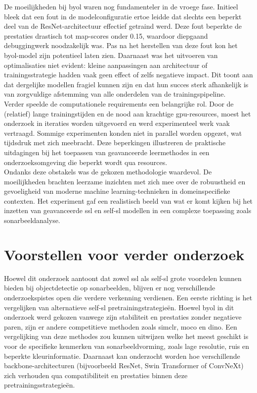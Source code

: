 De moeilijkheden bij \gls{byol} waren nog fundamenteler in de vroege fase. Initieel bleek dat een fout in de modelconfiguratie ertoe leidde dat slechts een beperkt deel van de ResNet-architectuur effectief getraind werd. Deze fout beperkte de prestaties drastisch tot \gls{map}-scores onder 0.15, waardoor diepgaand debuggingwerk noodzakelijk was. Pas na het herstellen van deze fout kon het \gls{byol}-model zijn potentieel laten zien. Daarnaast was het uitvoeren van optimalisaties niet evident: kleine aanpassingen aan architectuur of trainingsstrategie hadden vaak geen effect of zelfs negatieve impact. Dit toont aan dat dergelijke modellen fragiel kunnen zijn en dat hun succes sterk afhankelijk is van zorgvuldige afstemming van alle onderdelen van de trainingspipeline. \\

Verder speelde de computationele requirements een belangrijke rol. Door de (relatief) lange trainingstijden en de nood aan krachtige \gls{gpu}-resources, moest het onderzoek in iteraties worden uitgevoerd en werd experimenteel werk vaak vertraagd. Sommige experimenten konden niet in parallel worden opgezet, wat tijdsdruk met zich meebracht. Deze beperkingen illustreren de praktische uitdagingen bij het toepassen van geavanceerde leermethodes in een onderzoeksomgeving die beperkt wordt qua resources. \\

Ondanks deze obstakels was de gekozen methodologie waardevol. De moeilijkheden brachten leerzame inzichten met zich mee over de robuustheid en gevoeligheid van moderne machine learning-technieken in domeinspecifieke contexten. Het experiment gaf een realistisch beeld van wat er komt kijken bij het inzetten van geavanceerde \gls{ssl} en \gls{self-sl} modellen in een complexe toepassing zoals sonarbeeldanalyse.

\section{Voorstellen voor verder onderzoek}

Hoewel dit onderzoek aantoont dat zowel \gls{ssl} als \gls{self-sl} grote voordelen kunnen bieden bij objectdetectie op sonarbeelden, blijven er nog verschillende onderzoekspistes open die verdere verkenning verdienen. Een eerste richting is het vergelijken van alternatieve \gls{self-sl} pretrainingstrategieën. Hoewel \gls{byol} in dit onderzoek werd gekozen vanwege zijn stabiliteit en prestaties zonder negatieve paren, zijn er andere competitieve methoden zoals \gls{simclr}, \gls{moco} en \gls{dino}. Een vergelijking van deze methodes zou kunnen uitwijzen welke het meest geschikt is voor de specifieke kenmerken van sonarbeeldvorming, zoals lage resolutie, ruis en beperkte kleurinformatie. Daarnaast kan onderzocht worden hoe verschillende backbone-architecturen (bijvoorbeeld ResNet, Swin Transformer of ConvNeXt) zich verhouden qua compatibiliteit en prestaties binnen deze pretrainingsstrategieën. \\

